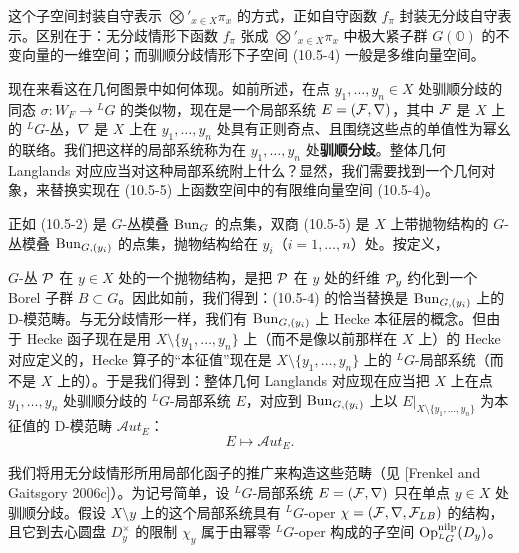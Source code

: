 这个子空间封装自守表示 $\bigotimes'_{x\in X}\pi_x$ 的方式，正如自守函数 $f_\pi$ 封装无分歧自守表示。区别在于：无分歧情形下函数 $f_\pi$ 张成 $\bigotimes'_{x\in X}\pi_x$ 中极大紧子群 $G(\mathbb{O})$ 的不变向量的一维空间；而驯顺分歧情形下子空间 (10.5-4) 一般是多维向量空间。

现在来看这在几何图景中如何体现。如前所述，在点 $y_1,\dots,y_n\in X$ 处驯顺分歧的同态 $\sigma:W_F\to{}^L G$ 的类似物，现在是一个局部系统 $E=(\mathcal{F},\nabla)$，其中 $\mathcal{F}$ 是 $X$ 上的 ${}^L G$-丛，$\nabla$ 是 $X$ 上在 $y_1,\dots,y_n$ 处具有正则奇点、且围绕这些点的单值性为幂幺的联络。我们把这样的局部系统称为在 $y_1,\dots,y_n$ 处\textbf{驯顺分歧}。整体几何 Langlands 对应应当对这种局部系统附上什么？显然，我们需要找到一个几何对象，来替换实现在 (10.5-5) 上函数空间中的有限维向量空间 (10.5-4)。

正如 (10.5-2) 是 $G$-丛模叠 $\operatorname{Bun}_G$ 的点集，双商 (10.5-5) 是 $X$ 上带抛物结构的 $G$-丛模叠 $\operatorname{Bun}_{G,(y_i)}$ 的点集，抛物结构给在 $y_i$（$i=1,\dots,n$）处。按定义，

$G$-丛 $\mathcal{P}$ 在 $y\in X$ 处的一个抛物结构，是把 $\mathcal{P}$ 在 $y$ 处的纤维 $\mathcal{P}_y$ 约化到一个 Borel 子群 $B\subset G$。因此如前，我们得到：(10.5-4) 的恰当替换是 $\operatorname{Bun}_{G,(y_i)}$ 上的 D-模范畴。与无分歧情形一样，我们有 $\operatorname{Bun}_{G,(y_i)}$ 上 Hecke 本征层的概念。但由于 Hecke 函子现在是用 $X\setminus\{y_1,\dots,y_n\}$ 上（而不是像以前那样在 $X$ 上）的 Hecke 对应定义的，Hecke 算子的“本征值”现在是 $X\setminus\{y_1,\dots,y_n\}$ 上的 ${}^L G$-局部系统（而不是 $X$ 上的）。于是我们得到：整体几何 Langlands 对应现在应当把 $X$ 上在点 $y_1,\dots,y_n$ 处驯顺分歧的 ${}^L G$-局部系统 $E$，对应到 $\operatorname{Bun}_{G,(y_i)}$ 上以 $E|_{X\setminus\{y_1,\dots,y_n\}}$ 为本征值的 D-模范畴 $\mathcal{A}ut_E$：
\[
    E \mapsto \mathcal{A}ut_E .
\]


我们将用无分歧情形所用局部化函子的推广来构造这些范畴（见 [Frenkel and Gaitsgory 2006c]）。为记号简单，设 ${}^L G$-局部系统 $E=(\mathcal{F},\nabla)$ 只在单点 $y\in X$ 处驯顺分歧。假设 $X\setminus y$ 上的这个局部系统具有 ${}^L G$-oper $\chi=(\mathcal{F},\nabla,\mathcal{F}_{LB})$ 的结构，且它到去心圆盘 $D^\times_y$ 的限制 $\chi_y$ 属于由幂零 ${}^L G$-oper 构成的子空间 $\operatorname{Op}^{\mathrm{nilp}}_{{}^L G}(D_y)$。

